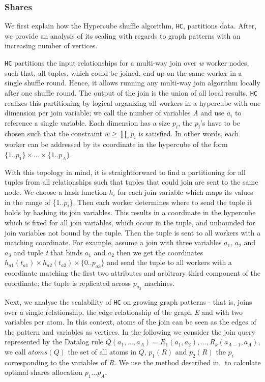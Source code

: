 \subsubsection{Shares}
We first explain how the Hypercube shuffle algorithm, \texttt{HC}, partitions data.
After, we provide an analysis of its scaling with regards to graph patterns with an increasing number of vertices.

\texttt{HC} partitions the input relationships for a multi-way join over \textit{w} worker nodes, such that, all tuples, which could be joined, end up on the same worker in a single shuffle round.
Hence, it allows running any multi-way join algorithm locally after one shuffle round.
The output of the join is the union of all local results.
\texttt{HC} realizes this partitioning by logical organizing all workers in a hypercube with one dimension per join variable; we call the number of variables \textit{A} and use $a_i$ to reference a single variable.
Each dimension has a size $p_i$, the $p_i$'s have to be chosen such that the constraint $w \ge \prod_{i}p_i$ is satisfied.  %
In other words, each worker can be addressed by its coordinate in the hypercube of the form $\{1..p_1\} \times ... \times \{1..p_A\}$.

With this topology in mind, it is straightforward to find a partitioning for all tuples from all relationships such that tuples that could join are sent to the same node.
We choose a hash function $h_i$ for each join variable which maps its values in the range of \{1..$p_i$\}.
Then each worker determines where to send the tuple it holds by hashing its join variables.
This results in a coordinate in the hypercube which is fixed for all join variables, which occur in the tuple, and unbounded for join variables not bound by the tuple.
Then the tuple is sent to all workers with a matching coordinate.
For example, assume a join with three variables $a_1$, $a_2$ and $a_3$ and tuple \textit{t} that binds $a_1$ and $a_2$ then we get the coordinates $h_{a1}(t_{a1}) \times h_{a2}(t_{a2}) \times \{0..p_{a3}\}$ and send the tuple
to all workers with a coordinate matching the first two attributes and arbitrary third component of the coordinate; the tuple is replicated across $p_{a_3}$ machines.

Next, we analyse the scalability of \texttt{HC} on growing graph patterns - that is, joins over a single relationship, the edge relationship of the graph \textit{E} and with two variables per atom.
In this context, atoms of the join can be seen as the edges of the pattern and variables as vertices.
In the following we consider the join query represented by the Datalog rule $Q(a_1, ..., a_A) = R_1(a_1, a_2), ..., R_k(a_{A-1}, a_A)$, we call $atoms(Q)$ the set of all atoms in $Q$, $p_1(R)$ and $p_2(R)$ the $p_i$ corresponding to the variables of $R$.
We use the method described in~\cite{myria-detailed} to calculate optimal shares allocation $p_1 ... p_A$.

